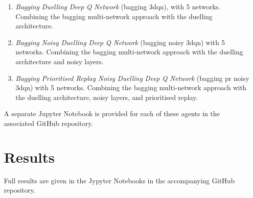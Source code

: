 \documentclass{article}
\begin{document}
\begin{enumerate}
    \item \emph{Bagging Duelling Deep Q Network} (bagging 3dqn), with 5 networks. Combining the bagging multi-network approach with the duelling architecture.
    
    \item \emph{Bagging Noisy Duelling Deep Q Network} (bagging noisy 3dqn) with 5 networks. Combining the bagging multi-network approach with the duelling architecture and noisy layers.
    
    \item \emph{Bagging Prioritised Replay Noisy Duelling Deep Q Network} (bagging pr noisy 3dqn) with 5 networks. Combining the bagging multi-network approach with the duelling architecture, noisy layers, and prioritised replay.

\end{enumerate}

A separate Jupyter Notebook is provided for each of these agents in the associated GitHub repository.

\section{Results}

Full results are given in the Jypyter Notebooks in the accompanying GitHub repository.
\end{document}
